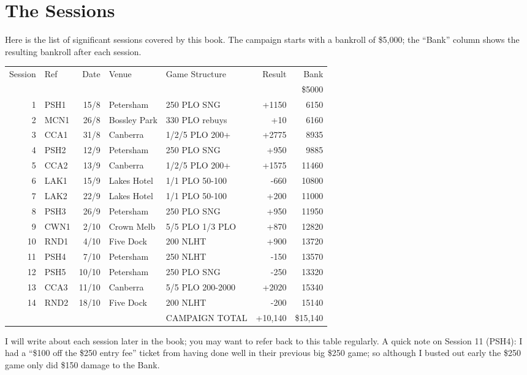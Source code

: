 \chapter{The Sessions}

Here is the list of significant sessions covered by this book. The
campaign starts with a bankroll of \$5,000; the ``Bank'' column shows
the resulting bankroll after each session.

\begin{tabular}{rlrllrr}
 Session & Ref & Date & Venue & Game Structure & Result & Bank \\
     &           &      &           &             &       & \$5000 \\
  1  &   PSH1    & 15/8 & Petersham & 250 PLO SNG & +1150 & 6150 \\
  2  &   MCN1    & 26/8 & Bossley Park & 330 PLO rebuys & +10 & 6160 \\
  3  &   CCA1    & 31/8 & Canberra  & 1/2/5 PLO 200+ & +2775 & 8935 \\
  4  &   PSH2    & 12/9 & Petersham & 250 PLO SNG & +950 & 9885 \\
  5  &   CCA2    & 13/9 & Canberra  & 1/2/5 PLO 200+ & +1575 & 11460 \\
  6  &   LAK1    & 15/9 & Lakes Hotel & 1/1 PLO 50-100 & -660 & 10800 \\
  7  &   LAK2    & 22/9 & Lakes Hotel & 1/1 PLO 50-100 & +200 & 11000 \\
  8  &   PSH3    & 26/9 & Petersham & 250 PLO SNG & +950 & 11950 \\
  9  &   CWN1    & 2/10 & Crown Melb & 5/5 PLO 1/3 PLO & +870 & 12820 \\
 10  &   RND1    & 4/10 & Five Dock & 200 NLHT & +900 & 13720 \\
 11  &   PSH4    & 7/10 & Petersham & 250 NLHT & -150 & 13570 \\
 12  &   PSH5    & 10/10 & Petersham & 250 PLO SNG & -250 & 13320 \\
 13  &   CCA3    & 11/10 & Canberra  & 5/5 PLO 200-2000 & +2020 & 15340 \\
 14  &   RND2    & 18/10 & Five Dock & 200 NLHT & -200 & 15140 \\
     &           &       &           & CAMPAIGN TOTAL & +10,140 & \$15,140 \\
\end{tabular}

I will write about each session later in the book; you may want to
refer back to this table regularly. A quick note on Session 11 (PSH4): I had
a ``\$100 off the \$250 entry fee'' ticket from having done well in
their previous big \$250 game; so although I busted out early the \$250
game only did \$150 damage to the Bank.

